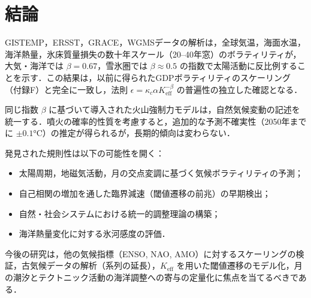 \documentclass[11pt,a4paper]{article}
\newcommand{\Keff}{K_{\mathrm{eff}}}
\newcommand{\kappac}{\kappa_c}
\newcommand{\be}{\beta}
\begin{document}
	\section{結論}
	
	GISTEMP，ERSST，GRACE，WGMSデータの解析は，全球気温，海面水温，海洋熱量，氷床質量損失の数十年スケール（20–40年窓）のボラティリティが，大気・海洋では $\be = 0.67$，雪氷圏では $\be \approx 0.5$ の指数で太陽活動に反比例することを示す．この結果は，以前に得られたGDPボラティリティのスケーリング（付録F）と完全に一致し，法則 $\epsilon = \kappac \alpha \Keff^{-\be}$ の普遍性の独立した確認となる．
	
	同じ指数 $\beta$ に基づいて導入された火山強制力モデルは，自然気候変動の記述を統一する．噴火の確率的性質を考慮すると，追加的な予測不確実性（2050年までに $\pm0.1$°C）の推定が得られるが，長期的傾向は変わらない．
	
	発見された規則性は以下の可能性を開く：
	\begin{itemize}
		\item 太陽周期，地磁気活動，月の交点変調に基づく気候ボラティリティの予測；
		\item 自己相関の増加を通した臨界減速（閾値遷移の前兆）の早期検出；
		\item 自然・社会システムにおける統一的調整理論の構築；
		\item 海洋熱量変化に対する氷河感度の評価．
	\end{itemize}
	
	今後の研究は，他の気候指標（ENSO, NAO, AMO）に対するスケーリングの検証，古気候データの解析（系列の延長），$\Keff$ を用いた閾値遷移のモデル化，月の潮汐とテクトニック活動の海洋調整への寄与の定量化に焦点を当てるべきである．
	
\end{document}
